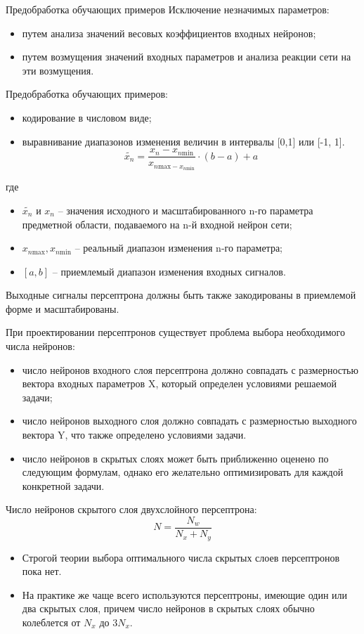 \documentclass{beamer}
\begin{document}
\begin{frame}[t]{Предобработка обучающих примеров}
	Исключение незначимых параметров:
	\begin{itemize}
		\item путем анализа значений весовых коэффициентов входных нейронов; 
		\item путем возмущения значений входных параметров и анализа реакции сети на эти возмущения.
	\end{itemize}
	Предобработка обучающих примеров:
	\begin{itemize}
		\item кодирование в числовом виде; 
		\item выравнивание диапазонов изменения величин в интервалы [0,1] или [-1, 1].
		\[
		\tilde{x_n} = \frac{x_n-x_{n\text{min}}}{x_{n\text{max}-x_{n\text{min}}}}\cdot (b-a)+a
		\]
	\end{itemize}
	где
	\begin{itemize}
		\item $\tilde{x_n}$ и $x_n$ -- значения исходного и масштабированного n-го параметра предметной области, подаваемого на n-й входной нейрон сети;
		\item $x_{n\text{max}}, x_{n\text{min}}$ -- реальный диапазон изменения n-го параметра;
		\item $[a,b]$ -- приемлемый диапазон изменения входных сигналов.
	\end{itemize}
	Выходные сигналы персептрона должны быть также закодированы в приемлемой форме и масштабированы.
\end{frame}

\begin{frame}[t]
	При проектировании персептронов существует проблема выбора необходимого числа нейронов: 
	\begin{itemize}
		\item число нейронов входного слоя персептрона должно совпадать с размерностью вектора входных параметров X, который определен условиями решаемой задачи;
		\item число нейронов выходного слоя должно совпадать с размерностью выходного вектора Y, что также определено условиями задачи. 
		\item число нейронов в скрытых слоях может быть приближенно оценено по следующим формулам, однако его желательно оптимизировать для каждой конкретной задачи.
	\end{itemize}
	Число нейронов скрытого слоя двухслойного персептрона:
	\[
		N = \frac{N_w}{N_x+N_y}
	\]	
	\begin{itemize}
		\item Строгой теории выбора оптимального числа скрытых слоев персептронов пока нет. 
		\item На практике же чаще всего используются персептроны, имеющие один или два скрытых слоя, причем число нейронов в скрытых слоях обычно колеблется от $N_x$ до $3N_x$.	
	\end{itemize}
\end{frame}
\end{document}
